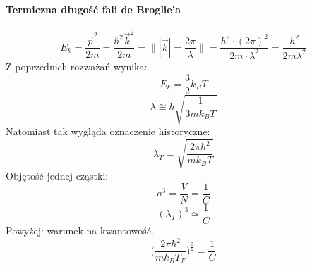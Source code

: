 \documentclass{article}
\begin{document}
		\paragraph{Termiczna długość fali de Broglie'a}
		\begin{equation}
		E_k = \frac{\vec{p}^2}{2m} = \frac{\hbar^2 \vec{k}^2}{2m} = \Bigg \|  |\vec{k}| = \frac{2 \pi}{\lambda} \Bigg \| = \frac{\hbar^2 \cdot (2\pi)^2}{2m \cdot \lambda^2} = \frac{h^2}{2m\lambda^2}
		\end{equation}
		Z poprzednich rozważań wynika:
		\begin{equation}
		E_k = \frac{3}{2}k_BT
		\end{equation}
		\begin{equation}
		\lambda \cong h\sqrt{\frac{1}{3mk_BT}}
		\end{equation}
		Natomiast tak wygląda oznaczenie historyczne:
		\begin{equation}
		\lambda_T = \sqrt{\frac{2\pi \hbar^2}{mk_BT}}
		\end{equation}
		Objętość jednej cząstki: 
		\begin{equation}
		a^3 = \frac{V}{N} = \frac{1}{C}
		\end{equation}
		\begin{equation}
		(\lambda_T)^3 \simeq \frac{1}{C}
		\end{equation}
		Powyżej: warunek na kwantowość.
		\begin{equation}
		\Bigg( \frac{2 \pi \hbar^2}{m k_B T_F} \Bigg)^{\frac{3}{2}} = \frac{1}{C}
		\end{equation}
\end{document}
